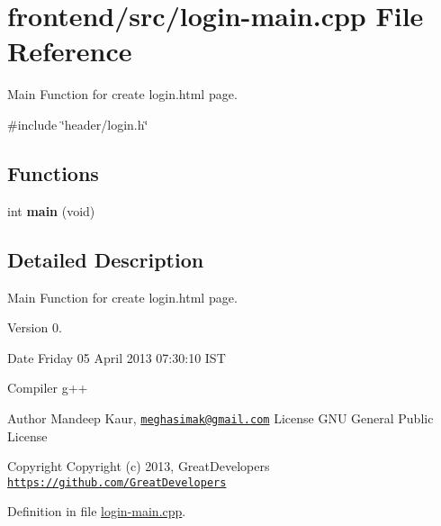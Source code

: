 \hypertarget{login-main_8cpp}{\section{frontend/src/login-\/main.cpp \-File \-Reference}
\label{d5/d3b/login-main_8cpp}
}


\-Main \-Function for create login.\-html page.  


{\ttfamily \#include \char`\"{}header/login.\-h\char`\"{}}\*
\subsection*{\-Functions}
\begin{DoxyCompactItemize}
\item 
\hypertarget{login-main_8cpp_a840291bc02cba5474a4cb46a9b9566fe}{int {\bfseries main} (void)}\label{d5/d3b/login-main_8cpp_a840291bc02cba5474a4cb46a9b9566fe}

\end{DoxyCompactItemize}


\subsection{\-Detailed \-Description}
\-Main \-Function for create login.\-html page. \begin{DoxyVersion}{\-Version}
0. 
\end{DoxyVersion}
\begin{DoxyDate}{\-Date}
\-Friday 05 \-April 2013 07\-:30\-:10 \-I\-S\-T\par
 \-Compiler g++
\end{DoxyDate}
\begin{DoxyAuthor}{\-Author}
\-Mandeep \-Kaur, \href{mailto:meghasimak@gmail.com}{\tt meghasimak@gmail.\-com} \-License \-G\-N\-U \-General \-Public \-License 
\end{DoxyAuthor}
\begin{DoxyCopyright}{\-Copyright}
\-Copyright (c) 2013, \-Great\-Developers \href{https://github.com/GreatDevelopers}{\tt https\-://github.\-com/\-Great\-Developers} 
\end{DoxyCopyright}


\-Definition in file \hyperlink{login-main_8cpp_source}{login-\/main.\-cpp}.

